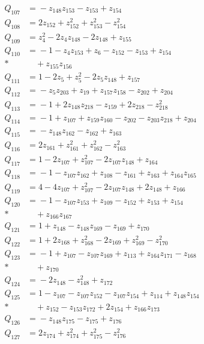 \begin{align*}
Q_{107} &={}-z_{148}z_{153} - z_{153} + z_{154}\\[4pt]
Q_{108} &={}2z_{152} + z_{152}^{2} + z_{153}^{2} - z_{154}^{2}\\[4pt]
Q_{109} &={}z_{4}^{2} - 2z_{4}z_{148} - 2z_{148} + z_{155}\\[4pt]
Q_{110} &={}-1 - z_{4}z_{153} + z_{6} - z_{152} - z_{153} + z_{154}\\*
&\quad{} + z_{155}z_{156}\\[4pt]
Q_{111} &={}1 - 2z_{5} + z_{5}^{2} - 2z_{5}z_{148} + z_{157}\\[4pt]
Q_{112} &={}-z_{5}z_{203} + z_{19} + z_{157}z_{158} - z_{202} + z_{204}\\[4pt]
Q_{113} &={}-1 + 2z_{148}z_{218} - z_{159} + 2z_{218} - z_{218}^{2}\\[4pt]
Q_{114} &={}-1 + z_{107} + z_{159}z_{160} - z_{202} - z_{203}z_{218} + z_{204}\\[4pt]
Q_{115} &={}-z_{148}z_{162} - z_{162} + z_{163}\\[4pt]
Q_{116} &={}2z_{161} + z_{161}^{2} + z_{162}^{2} - z_{163}^{2}\\[4pt]
Q_{117} &={}1 - 2z_{107} + z_{107}^{2} - 2z_{107}z_{148} + z_{164}\\[4pt]
Q_{118} &={}-1 - z_{107}z_{162} + z_{108} - z_{161} + z_{163} + z_{164}z_{165}\\[4pt]
Q_{119} &={}4 - 4z_{107} + z_{107}^{2} - 2z_{107}z_{148} + 2z_{148} + z_{166}\\[4pt]
Q_{120} &={}-1 - z_{107}z_{153} + z_{109} - z_{152} + z_{153} + z_{154}\\*
&\quad{} + z_{166}z_{167}\\[4pt]
Q_{121} &={}1 + z_{148} - z_{148}z_{169} - z_{169} + z_{170}\\[4pt]
Q_{122} &={}1 + 2z_{168} + z_{168}^{2} - 2z_{169} + z_{169}^{2} - z_{170}^{2}\\[4pt]
Q_{123} &={}-1 + z_{107} - z_{107}z_{169} + z_{113} + z_{164}z_{171} - z_{168}\\*
&\quad{} + z_{170}\\[4pt]
Q_{124} &={}-2z_{148} - z_{148}^{2} + z_{172}\\[4pt]
Q_{125} &={}1 - z_{107} - z_{107}z_{152} - z_{107}z_{154} + z_{114} + z_{148}z_{154}\\*
&\quad{} + z_{152} - z_{153}z_{172} + 2z_{154} + z_{166}z_{173}\\[4pt]
Q_{126} &={}-z_{148}z_{175} - z_{175} + z_{176}\\[4pt]
Q_{127} &={}2z_{174} + z_{174}^{2} + z_{175}^{2} - z_{176}^{2}\\[4pt]

\end{align*}
